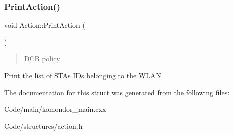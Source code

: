 \subsubsection{\texorpdfstring{Print\+Action()}{PrintAction()}}
{\footnotesize\ttfamily void Action\+::\+Print\+Action (\begin{DoxyParamCaption}{ }\end{DoxyParamCaption})\hspace{0.3cm}{\ttfamily [inline]}}



\begin{quote}
D\+CB policy \end{quote}


Print the list of S\+T\+As I\+Ds belonging to the W\+L\+AN 

The documentation for this struct was generated from the following files\+:\begin{DoxyCompactItemize}
\item 
Code/main/komondor\+\_\+main.\+cxx\item 
Code/structures/action.\+h\end{DoxyCompactItemize}
